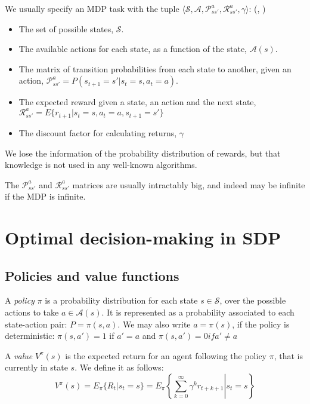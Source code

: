 We usually specify an \ac{MDP} task with the tuple $\langle \mathcal{S}, \mathcal{A},
\mathcal{P}^a_{ss'}, \mathcal{R}^a_{ss'}, \gamma \rangle$:
(\cite[Section~3.6]{sutton1998introduction}, \cite[Section~2.3]{blanco2015tfg})
\begin{itemize}
\item The set of possible states, $\mathcal{S}$.
\item The available actions for each state, as a function of the state, $\mathcal{A}(s)$.
\item The matrix of transition probabilities from each state to another, given
  an action, $\mathcal{P}^a_{ss'} = P(s_{t+1}=s' | s_t=s, a_t=a)$.
\item The expected reward given a state, an action and the next state,
 $\mathcal{R}^a_{ss'} = E \lbrace r_{t+1} | s_t=s, a_t=a, s_{t+1}=s' \rbrace$
\item The discount factor for calculating returns, $\gamma$
\end{itemize}

We lose the information of the probability distribution of rewards, but that
knowledge is not used in any well-known algorithms.

The $\mathcal{P}^a_{ss'}$ and $\mathcal{R}^a_{ss'}$ matrices are usually
intractably big, and indeed may be infinite if the \ac{MDP} is infinite.

\section{Optimal decision-making in SDP}
\subsection{Policies and value functions}
A \emph{policy} $\pi$ is a probability distribution for each state
$s\in\mathcal{S}$, over the possible actions to take $a \in \mathcal{A}(s)$. It
is represented as a probability associated to each state-action pair: $P =
\pi(s, a)$. We may also write $a = \pi(s)$, if the policy is deterministic:
$\pi(s, a')=1$ if $a'=a$ and $\pi(s, a')=0 if  a' \neq a$

A \emph{value} $V^\pi(s)$ is the expected return for an agent following the
policy $\pi$, that is currently in state $s$. We define it as follows:
\begin{equation}
  V^\pi(s) = E_\pi \lbrace R_t | s_t = s \rbrace =
  E_\pi \left\{ \left. \sum_{k=0}^\infty \gamma^kr_{t+k+1} \right| s_t = s \right\}
  \label{definition-value}
\end{equation}

